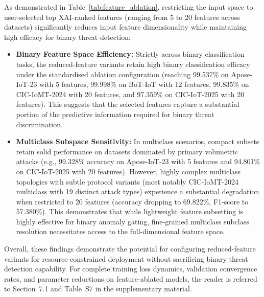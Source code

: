 \documentclass[a4paper,fleqn]{cas-sc}
\begin{document}
As demonstrated in Table~\ref{tab:feature_ablation}, restricting the input space to user-selected top XAI-ranked features (ranging from 5 to 20 features across datasets) significantly reduces input feature dimensionality while maintaining high efficacy for binary threat detection:
\begin{itemize}
    \item \textbf{Binary Feature Space Efficiency:} Strictly across binary classification tasks, the reduced-feature variants retain high binary classification efficacy under the standardised ablation configuration (reaching 99.537\% on Apose-IoT-23 with 5 features, 99.998\% on BoT-IoT with 12 features, 99.835\% on CIC-IoMT-2024 with 20 features, and 97.359\% on CIC-IoT-2025 with 20 features). This suggests that the selected features capture a substantial portion of the predictive information required for binary threat discrimination.
    \item \textbf{Multiclass Subspace Sensitivity:} In multiclass scenarios, compact subsets retain solid performance on datasets dominated by primary volumetric attacks (e.g., 99.328\% accuracy on Apose-IoT-23 with 5 features and 94.801\% on CIC-IoT-2025 with 20 features). However, highly complex multiclass topologies with subtle protocol variants (most notably CIC-IoMT-2024 multiclass with 19 distinct attack types) experience a substantial degradation when restricted to 20 features (accuracy dropping to 69.822\%, F1-score to 57.380\%). This demonstrates that while lightweight feature subsetting is highly effective for binary anomaly gating, fine-grained multiclass subclass resolution necessitates access to the full-dimensional feature space.
\end{itemize}
Overall, these findings demonstrate the potential for configuring reduced-feature variants for resource-constrained deployment without sacrificing binary threat detection capability. For complete training loss dynamics, validation convergence rates, and parameter reductions on feature-ablated models, the reader is referred to Section~7.1 and Table~S7 in the supplementary material.
\end{document}
